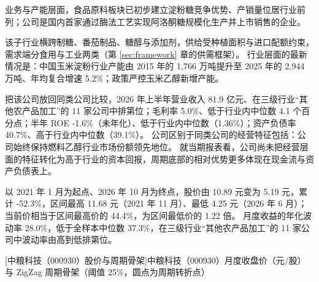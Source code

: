  业务与产能层面，食品原料板块已初步建立淀粉糖竞争优势、产销量位居行业前列；公司是国内首家通过酶法工艺实现阿洛酮糖规模化生产并上市销售的企业。

 该子行业横跨制糖、番茄制品、糖醇与添加剂，供给受种植面积与进口配额约束，需求端分食用与工业两类（第 \ref{sec:framework} 章的供需框架）。 行业层面的最新情况是：中国玉米淀粉行业产能由 2015 年的 1,766 万吨提升至 2025 年的 2,944 万吨、年均复合增速 5.2\%；政策严控玉米乙醇新增产能。

 把该公司放回同类公司比较，2026 年上半年营业收入 81.9 亿元、在三级行业“其他农产品加工”的 11 家公司中排第位；毛利率 5.0\%、低于行业内中位数 4.1 个百分点；半年 ROE -1.6\%（未年化）、低于行业内中位数（1.36\%）；资产负债率 40.7\%、高于行业内中位数（39.1\%）。 公司区别于同类公司的经营特征包括：公司始终保持燃料乙醇行业市场份额领先地位。 就当期报表看，公司尚未把经营层面的特征转化为高于行业的资本回报，周期底部的相对优势更多体现在现金流与资产负债表上。

 以 2021 年 1 月为起点、2026 年 10 月为终点，股价由 10.89 元变为 5.19 元，累计 -52.3\%，区间最高 11.68 元（2021 年 11 月）、最低 4.25 元（2026 年 6 月）；当前价相当于区间最高价的 44.4\%，为区间最低价的 1.22 倍。 月度收益的年化波动率 28.0\%，低于全样本中位数 37.3\%，在三级行业“其他农产品加工”的 11 家公司中波动率由高到低排第位。

\begin{center}
\begin{minipage}{\textwidth}\centering
{}

[中粮科技（000930）股价与周期骨架]{中粮科技（000930）月度收盘价（元/股）与 ZigZag 周期骨架（阈值 25\%，圆点为周期转折点）}
\end{minipage}
\end{center}

